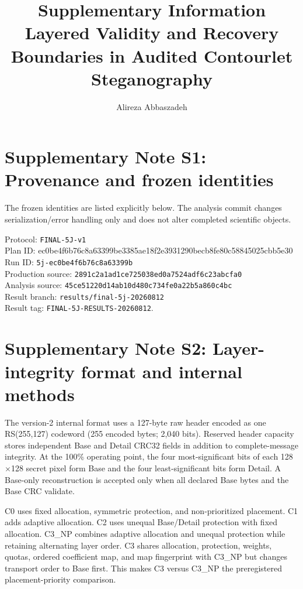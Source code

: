 \documentclass[10pt]{article}
\title{Supplementary Information\\Layered Validity and Recovery Boundaries in Audited Contourlet Steganography}
\author{Alireza Abbaszadeh}
\date{}
\newcommand{\code}[1]{\texttt{#1}}
\begin{document}
\maketitle


\section*{Supplementary Note S1: Provenance and frozen identities}
The frozen identities are listed explicitly below. The analysis commit changes serialization/error handling only and does not alter completed scientific objects.\par\smallskip
\noindent Protocol: \code{FINAL-5J-v1}\\
\noindent Plan ID: {\small\ttfamily ec0be4f6b76c8a63399be3385ae18f2e3931290becb8fe80c58845025cbb5e30}\\
\noindent Run ID: \code{5j-ec0be4f6b76c8a63399b}\\
\noindent Production source: \code{2891c2a1ad1ce725038ed0a7524adf6c23abcfa0}\\
\noindent Analysis source: \code{45ce51220d14ab10d480c734fe0a22b5a860c4bc}\\
\noindent Result branch: \code{results/final-5j-20260812}\\
\noindent Result tag: \code{FINAL-5J-RESULTS-20260812}.

\section*{Supplementary Note S2: Layer-integrity format and internal methods}
The version-2 internal format uses a 127-byte raw header encoded as one RS(255,127) codeword (255 encoded bytes; 2,040 bits). Reserved header capacity stores independent Base and Detail CRC32 fields in addition to complete-message integrity. At the 100\% operating point, the four most-significant bits of each 128$\times$128 secret pixel form Base and the four least-significant bits form Detail. A Base-only reconstruction is accepted only when all declared Base bytes and the Base CRC validate.

C0 uses fixed allocation, symmetric protection, and non-prioritized placement. C1 adds adaptive allocation. C2 uses unequal Base/Detail protection with fixed allocation. C3\_NP combines adaptive allocation and unequal protection while retaining alternating layer order. C3 shares allocation, protection, weights, quotas, ordered coefficient map, and map fingerprint with C3\_NP but changes transport order to Base first. This makes C3 versus C3\_NP the preregistered placement-priority comparison.
\end{document}
